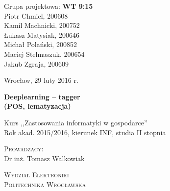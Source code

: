 \documentclass[a4paper, 11pt]{article}
\begin{document}
	
	\noindent
	\begin{minipage}[t]{.5\linewidth}
		\begin{flushleft}                           
			Grupa projektowa: \textbf{WT 9:15}\\
			\vspace{0.8cm}
			Piotr Chmiel, 200608\\
			Kamil Machnicki, 200752\\
			Łukasz Matysiak, 200646\\
			Michał Polański, 200852\\
			Maciej Stelmaszuk, 200654\\
			Jakub Zgraja, 200609\\
		\end{flushleft} 
	\end{minipage}%
	\begin{minipage}[t]{.5\linewidth}
		\begin{flushright}
			Wrocław, 29 luty 2016 r.\\
			\vspace{.35cm}

		\end{flushright}
	\end{minipage}
	
	\vspace{3.0cm}
	
	\begin{center}
		{\Huge\bf Deeplearning -- tagger}\\
		{\Large\bf (POS, lematyzacja)}\\
			
	\end{center}
	
	\begin{center}
		{\large Kurs ,,Zastosowania informatyki w gospodarce''}\\
		{\large Rok akad. 2015/2016, kierunek INF, studia II stopnia}
	\end{center}
	
	\vspace{2cm}
	\begin{center}
			\textsc{Prowadzący:}\\
			Dr inż. Tomasz Walkowiak
	\end{center}
	
	\thispagestyle{empty}
	
	\vfill
	\begin{center}
		{\Large \textsc{Wydział Elektroniki}}\\
		{\Large \textsc{Politechnika Wrocławska}}
	\end{center}
	
\end{document}
